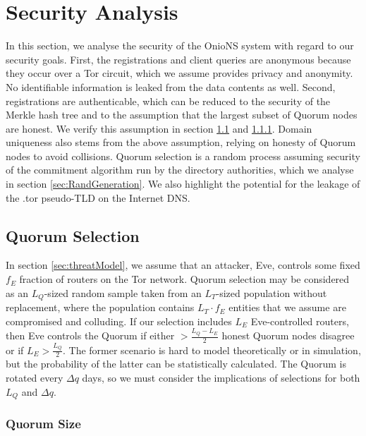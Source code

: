 \documentclass[USenglish,oneside,twocolumn]{article}
\begin{document}




\section{Security Analysis}
\label{sec:Analysis}

In this section, we analyse the security of the OnioNS system with regard to our security goals. First, the registrations and client queries are anonymous because they occur over a Tor circuit, which we assume provides privacy and anonymity. No identifiable information is leaked from the data contents as well. Second, registrations are authenticable, which can be reduced to the security of the Merkle hash tree and to the assumption that the largest subset of Quorum nodes are honest. We verify this assumption in section \ref{sec:QSelection} and \ref{sec:qSize}. Domain uniqueness also stems from the above assumption, relying on honesty of Quorum nodes to avoid collisions. Quorum selection is a random process assuming security of the commitment algorithm run by the directory authorities, which we analyse in section \ref{sec:RandGeneration}. We also highlight the potential for the leakage of the .tor pseudo-TLD on the Internet DNS.

\subsection{Quorum Selection}
\label{sec:QSelection}

In section \ref{sec:threatModel}, we assume that an attacker, Eve, controls some fixed $ f_{E} $ fraction of routers on the Tor network. Quorum selection may be considered as an $ L_{Q} $-sized random sample taken from an $ L_{T} $-sized population without replacement, where the population contains $ L_{T} \cdot f_{E} $ entities that we assume are compromised and colluding. If our selection includes $ L_{E} $ Eve-controlled routers, then Eve controls the Quorum if either $ > \frac{L_{Q} - L_{E}}{2} $ honest Quorum nodes disagree or if $ L_{E} > \frac{L_{Q}}{2} $. The former scenario is hard to model theoretically or in simulation, but the probability of the latter can be statistically calculated. The Quorum is rotated every $ \Delta q $ days, so we must consider the implications of selections for both $ L_{Q} $ and $ \Delta q $.

\subsubsection{Quorum Size}
\label{sec:qSize}
\end{document}
